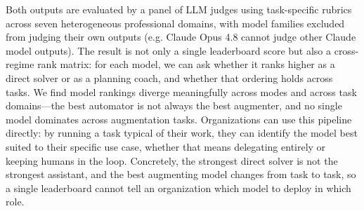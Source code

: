 Both outputs are evaluated by a panel of LLM judges using task-specific rubrics across seven heterogeneous professional domains, with model families excluded from judging their own outputs (e.g. Claude Opus 4.8 cannot judge other Claude model outputs). The result is not only a single leaderboard score but also a cross-regime rank matrix: for each model, we can ask whether it ranks higher as a direct solver or as a planning coach, and whether that ordering holds across tasks. We find model rankings diverge meaningfully across modes and across task domains—the best automator is not always the best augmenter, and no single model dominates across augmentation tasks. Organizations can use this pipeline directly: by running a task typical of their work, they can identify the model best suited to their specific use case, whether that means delegating entirely or keeping humans in the loop. Concretely, the strongest direct solver is not the strongest assistant, and the best augmenting model changes from task to task, so a single leaderboard cannot tell an organization which model to deploy in which role.



